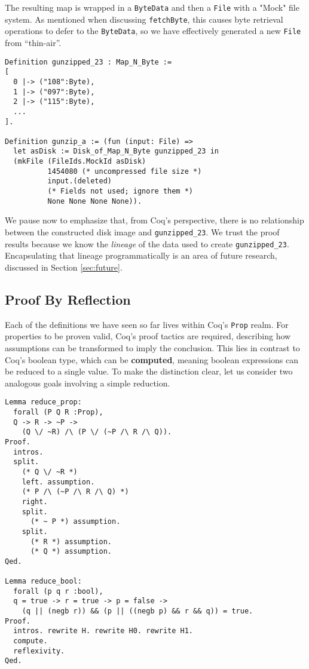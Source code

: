 \documentclass[nocopyrightspace]{sigplanconf}
\begin{document}
The resulting map is wrapped in a {\tt ByteData} and then a {\tt File} with a
"Mock" file system. As mentioned when discussing {\tt fetchByte}, this causes
byte retrieval operations to defer to the {\tt ByteData}, so we have
effectively generated a new {\tt File} from ``thin-air''.

\begin{lstlisting}
Definition gunzipped_23 : Map_N_Byte := 
[ 
  0 |-> ("108":Byte), 
  1 |-> ("097":Byte), 
  2 |-> ("115":Byte), 
  ...
].

Definition gunzip_a := (fun (input: File) => 
  let asDisk := Disk_of_Map_N_Byte gunzipped_23 in
  (mkFile (FileIds.MockId asDisk)
          1454080 (* uncompressed file size *)
          input.(deleted) 
          (* Fields not used; ignore them *)
          None None None None)).
\end{lstlisting}

We pause now to emphasize that, from Coq's perspective, there is no
relationship between the constructed disk image and {\tt gunzipped\_23}. We
trust the proof results because we know the {\em lineage} of the data used to
create {\tt gunzipped\_23}. Encapsulating that lineage programmatically is an
area of future research, discussed in Section \ref{sec:future}.

\subsection{Proof By Reflection}
\label{subsec:reflection}

Each of the definitions we have seen so far lives within Coq's {\tt Prop}
realm. For properties to be proven valid, Coq's proof tactics are required,
describing how assumptions can be transformed to imply the conclusion. This
lies in contrast to Coq's boolean type, which can be {\bf computed}, meaning
boolean expressions can be reduced to a single value. To make the distinction
clear, let us consider two analogous goals involving a simple reduction.

\begin{lstlisting}
Lemma reduce_prop:
  forall (P Q R :Prop),
  Q -> R -> ~P ->
    (Q \/ ~R) /\ (P \/ (~P /\ R /\ Q)).
Proof.
  intros.
  split.
    (* Q \/ ~R *)
    left. assumption.
    (* P /\ (~P /\ R /\ Q) *)
    right. 
    split.
      (* ~ P *) assumption.
    split.
      (* R *) assumption.
      (* Q *) assumption.
Qed.

Lemma reduce_bool:
  forall (p q r :bool),
  q = true -> r = true -> p = false ->
    (q || (negb r)) && (p || ((negb p) && r && q)) = true.
Proof.
  intros. rewrite H. rewrite H0. rewrite H1.
  compute.
  reflexivity.
Qed.
\end{lstlisting}
\end{document}
